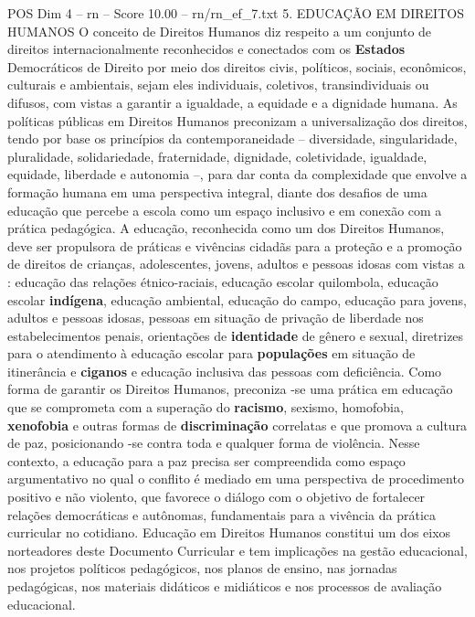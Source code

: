 \begin{textsample}{POS Dim 4 – rn – Score 10.00 – rn/rn\_ef\_7.txt}  \label{ex:f4_pos_088}
5.
EDUCAÇÃO EM DIREITOS HUMANOS O conceito de Direitos Humanos diz respeito a um conjunto de direitos internacionalmente reconhecidos e conectados com os \textbf{Estados} Democráticos de Direito por meio dos direitos civis, políticos, sociais, econômicos, culturais e ambientais, sejam eles individuais, coletivos, transindividuais ou difusos, com vistas a garantir a igualdade, a equidade e a dignidade humana.
As políticas públicas em Direitos Humanos preconizam a universalização dos direitos, tendo por base os princípios da contemporaneidade – diversidade, singularidade, pluralidade, solidariedade, fraternidade, dignidade, coletividade, igualdade, equidade, liberdade e autonomia –, para dar conta da complexidade que envolve a formação humana em uma perspectiva integral, diante dos desafios de uma educação que percebe a escola como um espaço inclusivo e em conexão com a prática pedagógica.
A educação, reconhecida como um dos Direitos Humanos, deve ser propulsora de práticas e vivências cidadãs para a proteção e a promoção de direitos de crianças, adolescentes, jovens, adultos e pessoas idosas com vistas a : educação das relações étnico-raciais, educação escolar quilombola, educação escolar \textbf{indígena}, educação ambiental, educação do campo, educação para jovens, adultos e pessoas idosas, pessoas em situação de privação de liberdade nos estabelecimentos penais, orientações de \textbf{identidade} de gênero e sexual, diretrizes para o atendimento à educação escolar para \textbf{populações} em situação de itinerância e \textbf{ciganos} e educação inclusiva das pessoas com deficiência.
Como forma de garantir os Direitos Humanos, preconiza -se uma prática em educação que se comprometa com a superação do \textbf{racismo}, sexismo, homofobia, \textbf{xenofobia} e outras formas de \textbf{discriminação} correlatas e que promova a cultura de paz, posicionando -se contra toda e qualquer forma de violência.
Nesse contexto, a educação para a paz precisa ser compreendida como espaço argumentativo no qual o conflito é mediado em uma perspectiva de procedimento positivo e não violento, que favorece o diálogo com o objetivo de fortalecer relações democráticas e autônomas, fundamentais para a vivência da prática curricular no cotidiano.
Educação em Direitos Humanos constitui um dos eixos norteadores deste Documento Curricular e tem implicações na gestão educacional, nos projetos políticos pedagógicos, nos planos de ensino, nas jornadas pedagógicas, nos materiais didáticos e midiáticos e nos processos de avaliação educacional.

\end{textsample}

